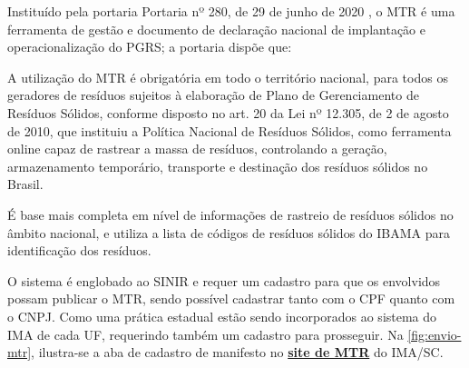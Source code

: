 Instituído pela portaria Portaria nº 280, de 29 de junho de 2020 \cite{mma_portaria_202}, o \gls{MTR} é uma ferramenta de gestão e documento de declaração nacional de implantação e operacionalização do \gls{PGRS}; a portaria dispõe que:

\begin{citacao}
	A utilização do MTR é obrigatória em todo o território nacional, para todos os geradores de resíduos sujeitos à elaboração de Plano de Gerenciamento de Resíduos Sólidos, conforme disposto no art. 20 da Lei nº 12.305, de 2 de agosto de 2010, que instituiu a Política Nacional de Resíduos Sólidos, como ferramenta online capaz de rastrear a massa de resíduos, controlando a geração, armazenamento temporário, transporte e destinação dos resíduos sólidos no Brasil. \cite[Art. 2º]{mma_portaria_202}
\end{citacao}

É base mais completa em nível de informações de rastreio de resíduos sólidos no âmbito nacional, e utiliza a lista de códigos de resíduos sólidos do \gls{IBAMA} para identificação dos resíduos.

O sistema é englobado ao \gls{SINIR} e requer um cadastro para que os envolvidos possam publicar o \gls{MTR}, sendo possível cadastrar tanto com o \gls{CPF} quanto com o \gls{CNPJ}. Como uma prática estadual estão sendo incorporados ao sistema do \gls{IMA} de cada \gls{UF}, requerindo também um cadastro para prosseguir. Na \autoref{fig:envio-mtr}, ilustra-se a aba de cadastro de manifesto no \href{http://mtr.ima.sc.gov.br/}{\textbf{site de MTR}} do \gls{IMA/SC}.

